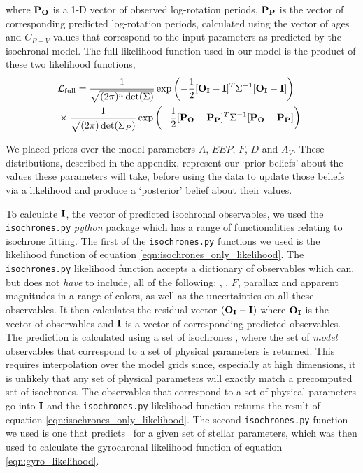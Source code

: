 where ${\bf P_O}$ is a 1-D vector of observed log-rotation periods, ${\bf
P_P}$ is the vector of corresponding predicted log-rotation periods,
calculated using the vector of ages and $C_{B-V}$ values that correspond to
the input parameters as predicted by the isochronal model.
The full likelihood function used in our model is the product of these two
likelihood functions,
\begin{eqnarray} \label{eqn:full_likelihood}
    & \mathcal{L_{\mathrm{full}}} = \frac{1}{\sqrt{(2\pi)^n \det(\Sigma)}}
    \exp\left( -\frac{1}{2} [{\bf O_I} - {\bf I}]^T \Sigma ^{-1}
    [{\bf O_I} - {\bf I}]\right) \\ \nonumber
    & \times
    \frac{1}{\sqrt{(2\pi) \det(\Sigma_P)}}
    \exp\left( -\frac{1}{2} [{\bf P_O} - {\bf P_P}]^T \Sigma ^{-1}
    [{\bf P_O} - {\bf P_P}]\right).
\end{eqnarray}

We placed priors over the model parameters $A$, $EEP$, $F$, $D$ and $A_V$.
These distributions, described in the appendix, represent our `prior beliefs'
about the values these parameters will take, before using the data to update
those beliefs via a likelihood and produce a `posterior' belief about their
values.

To calculate ${\bf I}$, the vector of predicted isochronal observables, we
used the {\tt isochrones.py} {\it python} package which has a range of
functionalities relating to isochrone fitting.
The first of the {\tt isochrones.py} functions we used is the likelihood
function of equation \ref{eqn:isochrones_only_likelihood}.
The {\tt isochrones.py} likelihood function accepts a dictionary of
observables which can, but does not {\it have} to include, all of the
following: \teff, \logg, $F$, parallax and apparent magnitudes in a range of
colors, as well as the uncertainties on all these observables.
It then calculates the residual vector $({\bf O_I} - {\bf I})$ where ${\bf
O_I}$ is the vector of observables and ${\bf I}$ is a vector of corresponding
predicted observables.
The prediction is calculated using a set of isochrones \citep[we used the MIST
models,][]{paxton2011, paxton2013, paxton2015, dotter2016, choi2016,
paxton2018}, where the set of {\it model} observables that correspond to a set
of physical parameters is returned.
This requires interpolation over the model grids since, especially at high
dimensions, it is unlikely that any set of physical parameters will exactly
match a precomputed set of isochrones.
The observables that correspond to a set of physical parameters go into ${\bf
I}$ and the {\tt isochrones.py} likelihood function returns the result of
equation \ref{eqn:isochrones_only_likelihood}.
The second {\tt isochrones.py} function we used is one that predicts \cbv\ for
a given set of stellar parameters, which was then used to calculate the
gyrochronal likelihood function of equation \ref{eqn:gyro_likelihood}.

